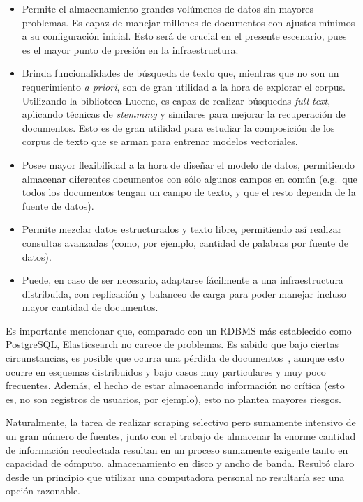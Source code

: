 \begin{itemize}

\item Permite el almacenamiento grandes volúmenes de datos sin mayores problemas. Es capaz de
manejar millones de documentos con ajustes mínimos a su configuración inicial. Esto será de crucial
en el presente escenario, pues es el mayor punto de presión en la infraestructura.

\item Brinda funcionalidades de búsqueda de texto que, mientras que no son un requerimiento
\textit{a priori}, son de gran utilidad a la hora de explorar el corpus. Utilizando la biblioteca
Lucene, es capaz de realizar búsquedas \textit{full-text}, aplicando técnicas de \textit{stemming} y
similares para mejorar la recuperación de documentos. Esto es de gran utilidad para estudiar la
composición de los corpus de texto que se arman para entrenar modelos vectoriales.

\item Posee mayor flexibilidad a la hora de diseñar el modelo de datos, permitiendo almacenar
diferentes documentos con sólo algunos campos en común (e.g.\ que todos los documentos tengan un
campo de texto, y que el resto dependa de la fuente de datos).

\item Permite mezclar datos estructurados y texto libre, permitiendo así realizar consultas
avanzadas (como, por ejemplo, cantidad de palabras por fuente de datos).

\item Puede, en caso de ser necesario, adaptarse fácilmente a una infraestructura distribuida, con
replicación y balanceo de carga para poder manejar incluso mayor cantidad de documentos.

\end{itemize}

Es importante mencionar que, comparado con un RDBMS más establecido como PostgreSQL, Elasticsearch
no carece de problemas. Es sabido que bajo ciertas circunstancias, es posible que ocurra una pérdida
de documentos~\cite{AphyrES}, aunque esto ocurre en esquemas distribuidos y bajo casos muy
particulares y muy poco frecuentes. Además, el hecho de estar almacenando información no crítica
(esto es, no son registros de usuarios, por ejemplo), esto no plantea mayores riesgos.

Naturalmente, la tarea de realizar scraping selectivo pero sumamente intensivo de un gran número de
fuentes, junto con el trabajo de almacenar la enorme cantidad de información recolectada resultan en un
proceso sumamente exigente tanto en capacidad de cómputo, almacenamiento en disco y ancho de
banda. Resultó claro desde un principio que utilizar una computadora personal no resultaría ser una
opción razonable.

